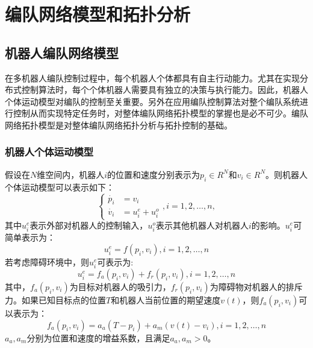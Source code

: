 

\chapter{编队网络模型和拓扑分析}
\label{chap:2}

\section{机器人编队网络模型}
在多机器人编队控制过程中，每个机器人个体都具有自主行动能力。尤其在实现分布式控制算法时，每个个体机器人需要具有独立的决策与执行能力。因此，机器人个体运动模型对编队的控制至关重要。另外在应用编队控制算法对整个编队系统进行控制从而实现特定任务时，对整体编队网络拓扑模型的掌握也是必不可少。编队网络拓扑模型是对整体编队网络拓扑分析与拓扑控制的基础\supercite{张飞2010}。

\subsection{机器人个体运动模型}
假设在$N$维空间内，机器人$i$的位置和速度分别表示为$p_i \in R^N$和$v_i \in R^N$。则机器人个体运动模型可以表示如下：\\
\begin{equation}
	\left\{
	\begin{aligned}
		\dot{p_i} & = v_i \\
		\dot{v_i} & = u_i^e + u_i^o
	\end{aligned}
	, i=1,2,\dots,n,
	\right.
\end{equation}
其中$u_i^e$表示外部对机器人的控制输入，$u_i^o$表示其他机器人对机器人$i$的影响。$u_i^e$可简单表示为：\\
\begin{equation}
	u_i^e = f(p_i,v_i), i=1,2,\dots,n
\end{equation}
若考虑障碍环境中，则$u_i^e$可表示为:\\
\begin{equation}
	u_i^e = f_a(p_i,v_i) + f_r(p_i,v_i), i=1,2,\dots,n
\end{equation}
其中，$f_a(p_i,v_i)$为目标对机器人的吸引力，$f_r(p_i,v_i)$为障碍物对机器人的排斥力。如果已知目标点的位置$T$和机器人当前位置的期望速度$v(t)$，则$f_a(p_i,v_i)$可以表示为：\\
\begin{equation}
	f_a(p_i,v_i) = a_a(T-p_i) + a_m(v(t)-v_i), i=1,2,\dots,n
\end{equation}
$a_a,a_m$分别为位置和速度的增益系数，且满足$a_a,a_m > 0$。

